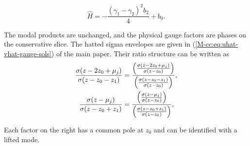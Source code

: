 \documentclass[11pt,a4paper]{article}
\newcommand{\externaleqref}[1]{\textup{(\ref*{#1})}}
\begin{document}
\begin{equation}
\hat{H} =  - \frac{\left({\gamma}_{1} - {\gamma}_{2}\right)^{2} {b}_{2}}{4} + {b}_{0}.
\end{equation}

The modal products are unchanged, and the physical gauge factors are phases on the conservative slice.
The hatted sigma envelopes are given in \externaleqref{M-cc:eq:uhat-vhat-gauge-sols} of the main paper.
Their ratio structure can be written as
\begin{align}
  \frac{ \sigma{\left(z - 2 z_{0} + {\mu}_{j}\right)} }{\sigma{\left(z - z_{0} - z_{1}\right)}} &= \frac{\left(\frac{\sigma{\left(z - 2 z_{0} + {\mu}_{j}\right)}}{\sigma{\left(z - z_{0}\right)}}\right)}{\left(\frac{\sigma{\left(z - z_{0} - z_{1}\right)}}{\sigma{\left(z - z_{0}\right)}}\right)}, \notag \\
  \frac{ \sigma{\left(z - {\mu}_{j}\right)} }{\sigma{\left(z - z_{0} + z_{1}\right)}} &= \frac{\left(\frac{\sigma{\left(z - {\mu}_{j}\right)}}{\sigma{\left(z - z_{0}\right)}}\right)}{\left(\frac{\sigma{\left(z - z_{0} + z_{1}\right)}}{\sigma{\left(z - z_{0}\right)}}\right)}, \label{cc:eq:two-to-three-ratios-sig}
\end{align}

Each factor on the right has a common pole at $z_0$ and can be identified with a lifted mode.
\end{document}
